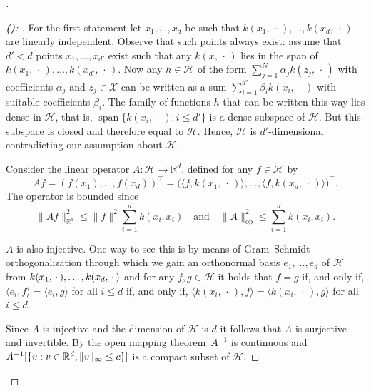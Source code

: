 \documentclass[10pt]{amsart}
\theoremstyle{definition}\newtheorem{defi}[theo]{Definition}\newtheorem{rema}[theo]{Remark}\newtheorem{exam}[theo]{Example}\newtheorem{exem}[theo]{Example}\newtheorem{nota}[theo]{Notation}
\theoremstyle{remark}
\DeclareMathOperator{\spn}{span}
\DeclareMathOperator{\opp}{op}
\newcommand{\R}{\mathbb{R}}
\newcommand{\X}{\mathcal{X}}
\newcommand{\cH}{\mathcal{H}}
\newcounter{setofstep}
\newcounter{step}[setofstep]
\newenvironment{step}[1][]{\refstepcounter{step}\begin{proof}[{\textbf{(\thestep)}\if#1\empty\else: #1\fi}]}{\let\qed\relax\end{proof}}
\renewcommand{\thestep}{\alph{step}}
\newenvironment{proofc}[1][\proofname]{\begin{proof}[{#1}]}{\end{proof}}\AtBeginDocument{\special{pdf:mapfile +yhmath.map}}
\begin{document}
\begin{proofc}

\begin{step}
For the first statement let $x_1,\dots, x_d$ be such that $k(x_1,\,\cdot\,), \dots, k(x_d,\,\cdot\,)$ are linearly independent. Observe that such points always exist: assume that $d' < d$ points $x_1,\dots, x_{d'}$ exist such that any $k(x,\,\cdot\,)$ lies in the span of $k(x_1,\,\cdot\,),\dots, k(x_{d'}, \,\cdot\,)$. Now any $h \in \cH$ of the form $\sum_{j=1}^N \alpha_j k(z_j,\,\cdot\,)$ with coefficients $\alpha_j$ and $z_j \in \X$ can be written as a sum $\sum_{i=1}^{d'} \beta_i k(x_i,\,\cdot\,)$ with suitable coefficients $\beta_i$. The family of functions $h$ that can be written this way lies dense in $\cH$, that is, $\spn \{k(x_i,\,\cdot\,) : i \leq d' \}$ is a dense subspace of $\cH$. But this subspace is closed and therefore equal to $\cH$. Hence, $\cH$ is $d'$-dimensional contradicting our assumption about $\cH$.

Consider the linear operator $A:\cH \rightarrow \R^d$, defined for any $f\in \cH$ by
\[
A f = (f(x_1), \dots, f(x_d))^\top = \bigl(\langle f,k(x_1,\,\cdot\,) \rangle, \dots, \langle f,k(x_d,\,\cdot\,) \rangle\bigr)^\top.
\]
The operator is bounded since
\[
\|A f\|^2_{\R^d} \leq \|f\|^2 \sum_{i=1}^d k(x_i,x_i)\quad\text{and}\quad \|A\|^2_{\opp} \leq \sum_{i=1}^d k(x_i,x_i).
\]

$A$ is also injective. One way to see this is by means of Gram--Schmidt orthogonalization through which we gain an orthonormal basis $e_1,\dots, e_d$ of $\cH$ from $k(x_1,\,\cdot\,), \dots,\linebreak k(x_d,\,\cdot\,)$ and for any $f,g \in \cH$ it holds that $f=g$ if, and only if, $\langle e_i,f\rangle = \langle e_i, g \rangle $ for all $i\leq d$ if, and only if, $\langle k(x_i,\,\cdot\,), f\rangle = \langle k(x_i, \,\cdot\,), g \rangle $ for all $i\leq d$.

Since $A$ is injective and the dimension of $\cH$ is $d$ it follows that $A$ is surjective and invertible. By the open mapping theorem~$A^{-1}$ is continuous and $A^{-1}[\{v : v\in \R^d,\linebreak \|v\|_\infty \leq c \}]$ is a compact subset of $\cH$.
\let\qed\relax
\end{step}


\end{proofc}
\end{document}
